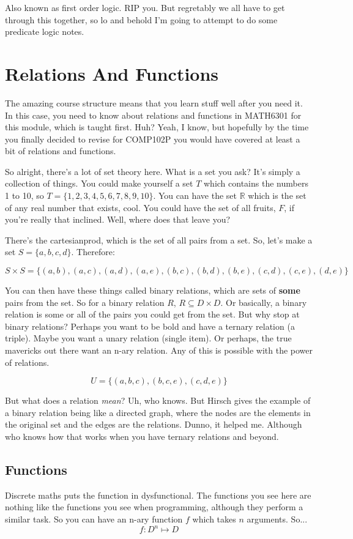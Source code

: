 Also known as first order logic. RIP you. But regretably we all have to get through this together, so lo and behold I'm going to attempt to do some predicate logic notes.

\section{Relations And Functions}
The amazing course structure means that you learn stuff well after you need it. In this case, you need to know about relations and functions in MATH6301 for this module, which is taught first. Huh? Yeah, I know, but hopefully by the time you finally decided to revise for COMP102P you would have covered at least a bit of relations and functions.

So alright, there's a lot of set theory here. What is a set you ask? It's simply a collection of things. You could make yourself a set $T$ which contains the numbers 1 to 10, so $T = \{1, 2, 3, 4, 5, 6, 7, 8, 9, 10\}$. You can have the set $\mathbb{R}$ which is the set of any real number that exists, cool. You could have the set of all fruits, $F$, if you're really that inclined. Well, where does that leave you?

There's the \gls{cartesianprod}, which is the set of all pairs from a set. So, let's make a set $S = \{a, b, c, d\}$. Therefore:

\[
    S \times S = \{(a,b), (a,c), (a,d), (a,e), (b,c), (b,d), (b,e), (c,d), (c,e), (d,e)\}
\]

You can then have these things called binary relations, which are sets of \textbf{some} pairs from the set. So for a binary relation $R$, $R \subseteq D \times D$. Or basically, a binary relation is some or all of the pairs you could get from the set. But why stop at binary relations? Perhaps you want to be bold and have a ternary relation (a triple). Maybe you want a unary relation (single item). Or perhaps, the true mavericks out there want an n-ary relation. Any of this is possible with the power of relations.

\[
    U = \{(a,b,c), (b,c,e), (c,d,e)\}
\]

But what does a relation \textit{mean}? Uh, who knows. But Hirsch gives the example of a binary relation being like a directed graph, where the nodes are the elements in the original set and the edges are the relations. Dunno, it helped me. Although who knows how that works when you have ternary relations and beyond.

\subsection{Functions}
Discrete maths puts the function in dysfunctional. The functions you see here are nothing like the functions you see when programming, although they perform a similar task. So you can have an n-ary function $f$ which takes $n$ arguments. So...
\[
    f : D^n \mapsto D
\]
